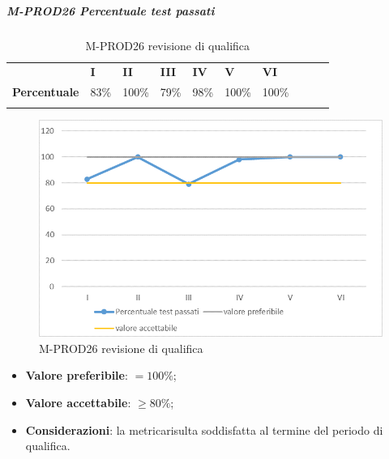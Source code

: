 \subparagraph{M-PROD26 Percentuale test passati} \mbox{}
\begin{longtable}[H!] {						
		>{}p{50mm}  		
		>{}p{8mm}
		>{}p{8mm}		
		>{}p{8mm}		
		>{}p{8mm}		
		>{}p{8mm}		
		>{}p{8mm}
		>{}p{8mm}
		>{}p{8mm}
		>{}p{8mm}
	}
	\rowcolor{gray!50}
	\textbf{} & \textbf{I} & \textbf{II} & \textbf{III} & \textbf{IV} & \textbf{V} & \textbf{VI} \TBstrut \\ [2mm]
	\textbf{Percentuale} & 83\% & 100\% & 79\% & 98\% & 100\% & 100\% \TBstrut \\ [2mm]
	\rowcolor{white}
	\caption{M-PROD26 revisione di qualifica}
\end{longtable}
\begin{figure}[H] 	
	\includegraphics[width=\linewidth]{./img/grafici/RQ26.png}	
	\caption{M-PROD26 revisione di qualifica}	
\end{figure}
\begin{itemize}
	\item \textbf{Valore preferibile}: $= 100\%$;
	\item \textbf{Valore accettabile}: $\ge 80\%$;
	\item \textbf{Considerazioni}: la metrica\glosp risulta soddisfatta al termine del periodo di qualifica.
\end{itemize}



























